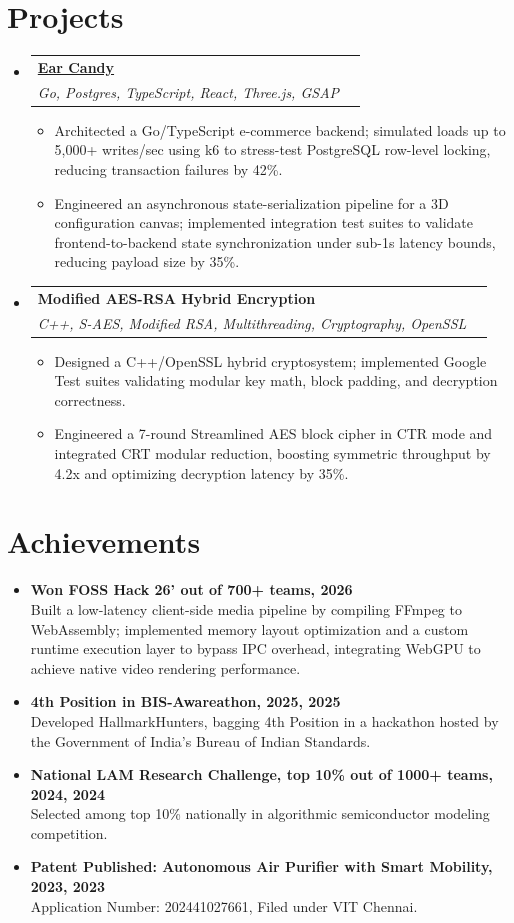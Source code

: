 \documentclass[a4paper,10pt]{extarticle}
\makeatletter
\newcommand{\resumeItemWithoutTitle}[1]{
  \item\normalsize{#1 \vspace{-2pt}}
}
\newcommand{\resumeSubheading}[4]{
  \vspace{-1pt}\item
  \begin{tabular*}{\textwidth}{l@{\extracolsep{\fill}}r}
    \textbf{#1} & #2 \\
    \textit{#3} & \textit{#4} \\
  \end{tabular*}\vspace{-5pt}
}
\newcommand{\resumeSubHeadingListStart}{\begin{itemize}[leftmargin=0in, label={}]}
\newcommand{\resumeSubHeadingListEnd}{\end{itemize}}
\newcommand{\resumeItemListStart}{\vspace{-5pt}\begin{itemize}}
\newcommand{\resumeItemListEnd}{\end{itemize}\vspace{-3pt}}
\makeatother
\begin{document}
\section{Projects}
\resumeSubHeadingListStart
\resumeSubheading{\href{https://github.com/Singh-Ishu/EarCandy3D}{Ear Candy}}{}{Go, Postgres, TypeScript, React, Three.js, GSAP}{}
\resumeItemListStart
\resumeItemWithoutTitle{Architected a Go/TypeScript e-commerce backend; simulated loads up to 5,000+ writes/sec using k6 to stress-test PostgreSQL row-level locking, reducing transaction failures by 42\%.}
\resumeItemWithoutTitle{Engineered an asynchronous state-serialization pipeline for a 3D configuration canvas; implemented integration test suites to validate frontend-to-backend state synchronization under sub-1s latency bounds, reducing payload size by 35\%.}
\resumeItemListEnd
\resumeSubheading{Modified AES-RSA Hybrid Encryption}{}{C++, S-AES, Modified RSA, Multithreading, Cryptography, OpenSSL}{}
\resumeItemListStart
\resumeItemWithoutTitle{Designed a C++/OpenSSL hybrid cryptosystem; implemented Google Test suites validating modular key math, block padding, and decryption correctness.}
\resumeItemWithoutTitle{Engineered a 7-round Streamlined AES block cipher in CTR mode and integrated CRT modular reduction, boosting symmetric throughput by 4.2x and optimizing decryption latency by 35\%.}
\resumeItemListEnd
\resumeSubHeadingListEnd

\section{Achievements}
\resumeSubHeadingListStart
\item \textbf{Won FOSS Hack 26' out of 700+ teams, 2026} \\ Built a low-latency client-side media pipeline by compiling FFmpeg to WebAssembly; implemented memory layout optimization and a custom runtime execution layer to bypass IPC overhead, integrating WebGPU to achieve native video rendering performance. \vspace{-2pt}
\item \textbf{4th Position in BIS-Awareathon, 2025, 2025} \\ Developed HallmarkHunters, bagging 4th Position in a hackathon hosted by the Government of India's Bureau of Indian Standards. \vspace{-2pt}
\item \textbf{National LAM Research Challenge, top 10\% out of 1000+ teams, 2024, 2024} \\ Selected among top 10\% nationally in algorithmic semiconductor modeling competition. \vspace{-2pt}
\item \textbf{Patent Published: Autonomous Air Purifier with Smart Mobility, 2023, 2023} \\ Application Number: 202441027661, Filed under VIT Chennai. \vspace{-2pt}
\resumeSubHeadingListEnd
\end{document}
